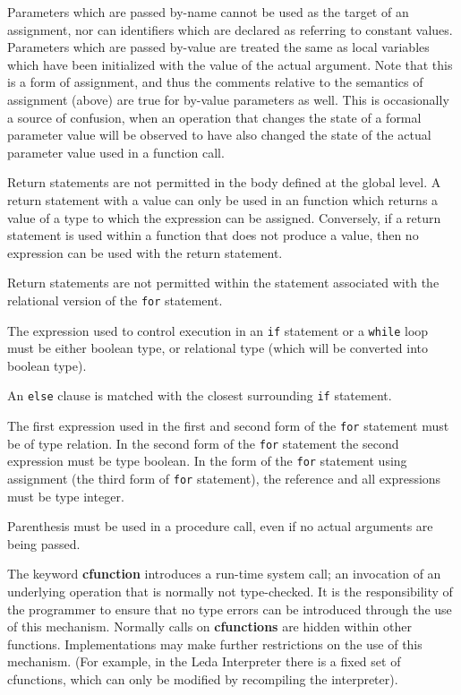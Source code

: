 Parameters which are passed by-name cannot be used as the target of
an assignment, nor can identifiers which are declared as referring to
constant values.
Parameters which are passed by-value are treated
the same as local variables which have been initialized with the value
of the actual argument.  Note that this is a form of assignment,
and thus the comments relative to the semantics of assignment (above)
are true for by-value parameters as well.  This is occasionally a source
of confusion, when an operation that changes the state of a formal parameter
value will be observed to have also changed the state of the actual
parameter value used in a function call.

Return statements are not permitted in the body defined at the global
level.  A return statement with a value can only be used in an
function which returns a value of a type to which the expression
can be assigned.  Conversely, if a return statement is used within
a function that does not produce a value, then no expression
can be used with the return statement.

Return statements are not permitted within the statement associated
with the relational version of the {\tt for} statement.

The expression used to control execution in an {\tt if} statement or
a {\tt while} loop must be either boolean type, or relational type
(which will be converted into boolean type).

An {\tt else} clause is matched with the closest surrounding {\tt if} statement.

The first expression used in the first and second form of the {\tt for}
statement must be of type relation.  In the second form of the {\tt for}
statement the second expression must be type boolean.
In the form of the {\tt for} statement using assignment (the third
form of {\tt for} statement), the reference and all expressions
must be type integer.

Parenthesis must be used in a procedure call, even if no actual
arguments are being passed.

The keyword {\bf cfunction} introduces a run-time system call; an invocation
of an underlying operation that is normally not type-checked.
It is the responsibility of the programmer to ensure that no
type errors can be introduced through the use of this mechanism.
Normally calls on {\bf cfunctions} are hidden within other
functions.  Implementations may make further restrictions on
the use of this mechanism.  (For example, in the Leda Interpreter there
is a fixed set of cfunctions, which can only be modified by recompiling
the interpreter).

